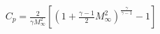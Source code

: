 \documentclass[10pt]{article}
\begin{document}
\begin{align*}C_{p}=\frac{2}{\gamma M_{\infty}^2}
 \left[ \left( 1 + \frac{\gamma-1}{2} M_{\infty}^2 \right)^{\frac{\gamma}{\gamma-1} } -1 \right]\end{align*}
\end{document}
